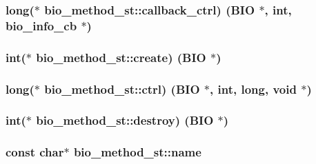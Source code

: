 \subsubsection[{\texorpdfstring{callback\+\_\+ctrl}{callback_ctrl}}]{\setlength{\rightskip}{0pt plus 5cm}long($\ast$ bio\+\_\+method\+\_\+st\+::callback\+\_\+ctrl) ({\bf B\+IO} $\ast$, int, {\bf bio\+\_\+info\+\_\+cb} $\ast$)}\hypertarget{structbio__method__st_a6b1b0a905468bba2ee191ae0401a65a3}{}\label{structbio__method__st_a6b1b0a905468bba2ee191ae0401a65a3}
\subsubsection[{\texorpdfstring{create}{create}}]{\setlength{\rightskip}{0pt plus 5cm}int($\ast$ bio\+\_\+method\+\_\+st\+::create) ({\bf B\+IO} $\ast$)}\hypertarget{structbio__method__st_a79d9b2836d02d86c8aaf859093e5a3f5}{}\label{structbio__method__st_a79d9b2836d02d86c8aaf859093e5a3f5}
\subsubsection[{\texorpdfstring{ctrl}{ctrl}}]{\setlength{\rightskip}{0pt plus 5cm}long($\ast$ bio\+\_\+method\+\_\+st\+::ctrl) ({\bf B\+IO} $\ast$, int, long, void $\ast$)}\hypertarget{structbio__method__st_ad0b4e0005a2dc107eb04a0dbec8f26b6}{}\label{structbio__method__st_ad0b4e0005a2dc107eb04a0dbec8f26b6}
\subsubsection[{\texorpdfstring{destroy}{destroy}}]{\setlength{\rightskip}{0pt plus 5cm}int($\ast$ bio\+\_\+method\+\_\+st\+::destroy) ({\bf B\+IO} $\ast$)}\hypertarget{structbio__method__st_a082d42c342cf11044b9a634ae96a4c94}{}\label{structbio__method__st_a082d42c342cf11044b9a634ae96a4c94}
\subsubsection[{\texorpdfstring{name}{name}}]{\setlength{\rightskip}{0pt plus 5cm}const char$\ast$ bio\+\_\+method\+\_\+st\+::name}\hypertarget{structbio__method__st_af69506d10c7b6ee584d7ebf99a1b84ba}{}\label{structbio__method__st_af69506d10c7b6ee584d7ebf99a1b84ba}
